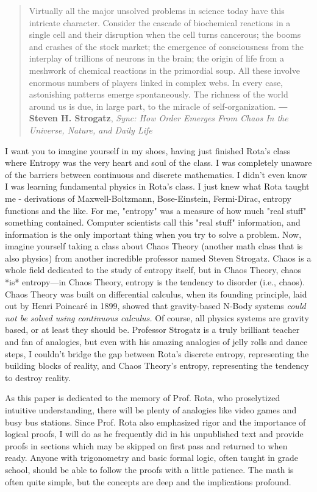 \documentclass{report}
\begin{document}
\begin{quotation}
    Virtually all the major unsolved problems in science today have this intricate character. Consider the cascade of biochemical reactions in a single cell and their disruption when the cell turns cancerous; the booms and crashes of the stock market; the emergence of consciousness from the interplay of trillions of neurons in the brain; the origin of life from a meshwork of chemical reactions in the primordial soup. All these involve enormous numbers of players linked in complex webs. In every case, astonishing patterns emerge spontaneously. The richness of the world around us is due, in large part, to the miracle of self-organization.
    \newline
    ― \textbf{Steven H. Strogatz}, \textit{Sync: How Order Emerges From Chaos In the Universe, Nature, and Daily Life}\cite{Strogatz2003}
\end{quotation}

I want you to imagine yourself in my shoes, having just finished Rota's class where Entropy was the very heart and soul of the class. I was completely unaware of the barriers between continuous and discrete mathematics. I didn't even know I was learning fundamental physics in Rota's class. I just knew what Rota taught me - derivations of Maxwell-Boltzmann, Bose-Einstein, Fermi-Dirac, entropy functions and the like. For me, "entropy" was a measure of how much "real stuff" something contained. Computer scientists call this "real stuff" information, and information is the only important thing when you try to solve a problem. Now, imagine yourself taking a class about Chaos Theory (another math class that is also physics) from another incredible professor named Steven Strogatz. Chaos is a whole field dedicated to the study of entropy itself, but in Chaos Theory, chaos *is* entropy—in Chaos Theory, entropy is the tendency to disorder (i.e., chaos). Chaos Theory was built on differential calculus, when its founding principle, laid out by Henri Poincaré in 1899, showed that gravity-based N-Body systems \emph{could not be solved using continuous calculus.} Of course, all physics systems are gravity based, or at least they should be. Professor Strogatz is a truly brilliant teacher and fan of analogies, but even with his amazing analogies of jelly rolls and dance steps, I couldn't bridge the gap between Rota's discrete entropy, representing the building blocks of reality, and Chaos Theory's entropy, representing the tendency to destroy reality.

As this paper is dedicated to the memory of Prof. Rota, who proselytized intuitive understanding, there will be plenty of analogies like video games and busy bus stations. Since Prof. Rota also emphasized rigor and the importance of logical proofs, I will do as he frequently did in his unpublished text and provide proofs in sections which may be skipped on first pass and returned to when ready. Anyone with trigonometry and basic formal logic, often taught in grade school, should be able to follow the proofs with a little patience. The math is often quite simple, but the concepts are deep and the implications profound.
\end{document}
